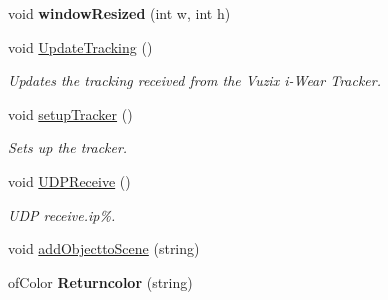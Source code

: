 \begin{DoxyCompactItemize}
\item 
\hypertarget{classtest_app_a428b7df9c64352d6e7cb234fc297e6c9}{void {\bfseries window\-Resized} (int w, int h)}\label{classtest_app_a428b7df9c64352d6e7cb234fc297e6c9}

\item 
void \hyperlink{classtest_app_a853bbabdab3e7d2f207bb5a2028990bd}{Update\-Tracking} ()
\begin{DoxyCompactList}\small\item\em Updates the tracking received from the Vuzix i-\/\-Wear Tracker. \end{DoxyCompactList}\item 
void \hyperlink{classtest_app_a6a4db7a6a914fc4899763fc94bfca4b7}{setup\-Tracker} ()
\begin{DoxyCompactList}\small\item\em Sets up the tracker. \end{DoxyCompactList}\item 
void \hyperlink{classtest_app_ae18e12d5025a2167ebd63ca019468cc0}{U\-D\-P\-Receive} ()
\begin{DoxyCompactList}\small\item\em U\-D\-P receive.ip\%. \end{DoxyCompactList}\item 
void \hyperlink{classtest_app_aa1d58aa9130d8d7526eb407f13f7a833}{add\-Objectto\-Scene} (string)
\item 
\hypertarget{classtest_app_a689f3b0cf0b38217152da7f5ce0d609f}{of\-Color {\bfseries Returncolor} (string)}\label{classtest_app_a689f3b0cf0b38217152da7f5ce0d609f}


\end{DoxyCompactItemize}
